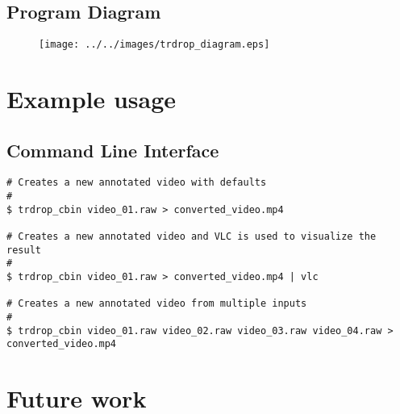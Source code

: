 \documentclass[titlepage]{article}
\begin{document}
\subsection{Program Diagram}

\begin{figure}[H]
\hspace{-30mm}
\texttt{[image: ../../images/trdrop\_diagram.eps]}
\end{figure}

\section{Example usage}

\subsection{Command Line Interface}

\begin{verbatim}
# Creates a new annotated video with defaults
#
$ trdrop_cbin video_01.raw > converted_video.mp4

# Creates a new annotated video and VLC is used to visualize the result
#
$ trdrop_cbin video_01.raw > converted_video.mp4 | vlc

# Creates a new annotated video from multiple inputs
#
$ trdrop_cbin video_01.raw video_02.raw video_03.raw video_04.raw > converted_video.mp4
\end{verbatim}


\section{Future work}
\end{document}
